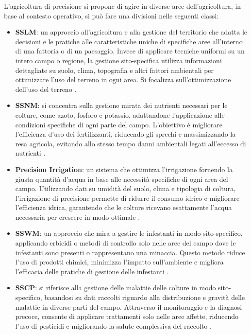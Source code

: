 \documentclass[12pt,a4paper,openright,twoside]{book}
\begin{document}
L'agricoltura di precisione si propone di agire in diverse aree dell'agricoltura, in base al contesto operativo, si può fare una divisioni nelle seguenti classi:
\begin{itemize}[noitemsep]
    \item \textbf{\ac{SSLM}}: un approccio all'agricoltura e alla gestione del territorio che adatta le decisioni e le pratiche alle caratteristiche uniche di specifiche aree all'interno di una fattoria o di un paesaggio. Invece di applicare tecniche uniformi su un intero campo o regione, la gestione sito-specifica utilizza informazioni dettagliate su suolo, clima, topografia e altri fattori ambientali per ottimizzare l'uso del terreno in ogni area. Si focalizza sull'ottimizzazione dell'uso del terreno \cite{SSLM}.
    \item \textbf{\ac{SSNM}}: si concentra sulla gestione mirata dei nutrienti necessari per le colture, come azoto, fosforo e potassio, adattandone l'applicazione alle condizioni specifiche di ogni parte del campo. L'obiettivo è migliorare l'efficienza d'uso dei fertilizzanti, riducendo gli sprechi e massimizzando la resa agricola, evitando allo stesso tempo danni ambientali legati all'eccesso di nutrienti \cite{SSNM}.
    \item \textbf{Precision Irrigation}: un sistema che ottimizza l'irrigazione fornendo la giusta quantità d'acqua in base alle necessità specifiche di ogni area del campo. Utilizzando dati su umidità del suolo, clima e tipologia di coltura, l'irrigazione di precisione permette di ridurre il consumo idrico e migliorare l'efficienza idrica, garantendo che le colture ricevano esattamente l'acqua necessaria per crescere in modo ottimale \cite{ANJUM202385}.
    \item \textbf{\ac{SSWM}}: un approccio che mira a gestire le infestanti in modo sito-specifico, applicando erbicidi o metodi di controllo solo nelle aree del campo dove le infestanti sono presenti o rappresentano una minaccia. Questo metodo riduce l'uso di prodotti chimici, minimizza l'impatto sull'ambiente e migliora l'efficacia delle pratiche di gestione delle infestanti \cite{SSWM}.
    \item \textbf{\ac{SSCP}}: si riferisce alla gestione delle malattie delle colture in modo sito-specifico, basandosi su dati raccolti riguardo alla distribuzione e gravità delle malattie in diverse parti del campo. Attraverso il monitoraggio e la diagnosi precoce, consente di applicare trattamenti solo nelle aree affette, riducendo l'uso di pesticidi e migliorando la salute complessiva del raccolto \cite{SSCP}.
\end{itemize}
\end{document}
